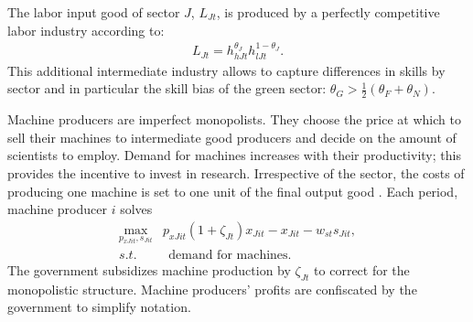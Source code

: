 The labor input good of sector $J$, $L_{Jt}$, is produced by a perfectly competitive labor industry according to: 
\begin{align}
L_{Jt}=h_{hJt}^{\theta_J}h_{lJt}^{1-\theta_J}.
\end{align}
This additional intermediate industry allows to capture differences in skills by sector and in particular the skill bias of the green sector: $\theta_G>\frac{1}{2}(\theta_F+\theta_N)$. 

Machine producers are imperfect monopolists. They choose the price at which to sell their machines to intermediate good producers and decide on the amount of scientists to employ. Demand for machines increases with their productivity; this provides the incentive to invest in research. Irrespective of the sector, the costs of producing one machine is set to one unit of the final output good \citep[similar to][]{Fried2018ClimateAnalysis, Acemoglu2012TheChange}.
Each period, machine producer $i$ solves
\begin{align}
\underset{p_{xJit}, s_{Jit}}{\max}&p_{xJit}(1+\zeta_{Jt})x_{Jit}-x_{Jit}-w_{st}s_{Jit},\\
s.t.&\ \ \text{demand for machines}.
\end{align}
The government subsidizes machine production by $\zeta_{Jt}$ to correct for the monopolistic structure. Machine producers' profits are confiscated by the government to simplify notation.

